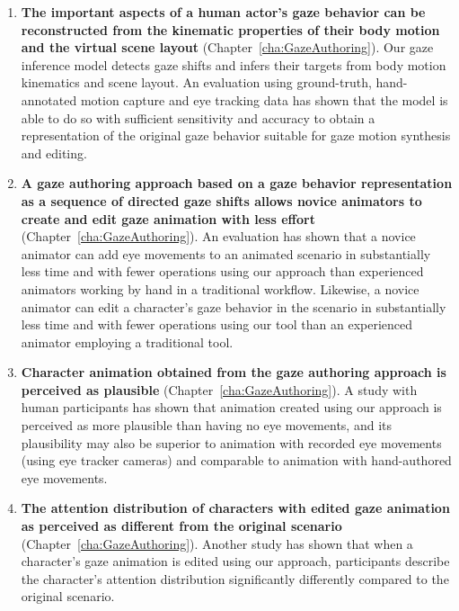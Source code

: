 \begin{enumerate}
\item \textbf{The important aspects of a human actor's gaze behavior can be reconstructed from the kinematic properties of their body motion and the virtual scene layout} (Chapter~\ref{cha:GazeAuthoring}). Our gaze inference model detects gaze shifts and infers their targets from body motion kinematics and scene layout. An evaluation using ground-truth, hand-annotated motion capture and eye tracking data has shown that the model is able to do so with sufficient sensitivity and accuracy to obtain a representation of the original gaze behavior suitable for gaze motion synthesis and editing.
\item \textbf{A gaze authoring approach based on a gaze behavior representation as a sequence of directed gaze shifts allows novice animators to create and edit gaze animation with less effort} (Chapter~\ref{cha:GazeAuthoring}). An evaluation has shown that a novice animator can add eye movements to an animated scenario in substantially less time and with fewer operations using our approach than experienced animators working by hand in a traditional workflow. Likewise, a novice animator can edit a character's gaze behavior in the scenario in substantially less time and with fewer operations using our tool than an experienced animator employing a traditional tool.
\item \textbf{Character animation obtained from the gaze authoring approach is perceived as plausible} (Chapter~\ref{cha:GazeAuthoring}). A study with human participants has shown that animation created using our approach is perceived as more plausible than having no eye movements, and its plausibility may also be superior to animation with recorded eye movements (using eye tracker cameras) and comparable to animation with hand-authored eye movements.
\item \textbf{The attention distribution of characters with edited gaze animation as perceived as different from the original scenario} (Chapter~\ref{cha:GazeAuthoring}). Another study has shown that when a character's gaze animation is edited using our approach, participants describe the character's attention distribution significantly differently compared to the original scenario.
\end{enumerate}
